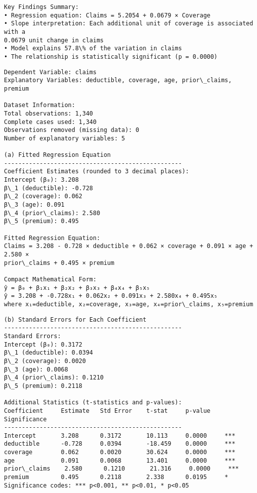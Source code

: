\documentclass[8pt, twocolumn]{extarticle}
\begin{document}
    \begin{Verbatim}[commandchars=\\\{\}]
Key Findings Summary:
• Regression equation: Claims = 5.2054 + 0.0679 × Coverage
• Slope interpretation: Each additional unit of coverage is associated with a
0.0679 unit change in claims
• Model explains 57.8\% of the variation in claims
• The relationship is statistically significant (p = 0.0000)
    \end{Verbatim}
    \begin{Verbatim}[commandchars=\\\{\}]
Dependent Variable: claims
Explanatory Variables: deductible, coverage, age, prior\_claims, premium

Dataset Information:
Total observations: 1,340
Complete cases used: 1,340
Observations removed (missing data): 0
Number of explanatory variables: 5

(a) Fitted Regression Equation
--------------------------------------------------
Coefficient Estimates (rounded to 3 decimal places):
Intercept (β₀): 3.208
β\_1 (deductible): -0.728
β\_2 (coverage): 0.062
β\_3 (age): 0.091
β\_4 (prior\_claims): 2.580
β\_5 (premium): 0.495

Fitted Regression Equation:
Claims = 3.208 - 0.728 × deductible + 0.062 × coverage + 0.091 × age + 2.580 ×
prior\_claims + 0.495 × premium

Compact Mathematical Form:
ŷ = β₀ + β₁x₁ + β₂x₂ + β₃x₃ + β₄x₄ + β₅x₅
ŷ = 3.208 + -0.728x₁ + 0.062x₂ + 0.091x₃ + 2.580x₄ + 0.495x₅
where x₁=deductible, x₂=coverage, x₃=age, x₄=prior\_claims, x₅=premium
    \end{Verbatim}
    \begin{Verbatim}[commandchars=\\\{\}]
(b) Standard Errors for Each Coefficient
--------------------------------------------------
Standard Errors:
Intercept (β₀): 0.3172
β\_1 (deductible): 0.0394
β\_2 (coverage): 0.0020
β\_3 (age): 0.0068
β\_4 (prior\_claims): 0.1210
β\_5 (premium): 0.2118

Additional Statistics (t-statistics and p-values):
Coefficient     Estimate   Std Error    t-stat     p-value    Significance
--------------------------------------------------
Intercept       3.208      0.3172       10.113     0.0000     ***
deductible      -0.728     0.0394       -18.459    0.0000     ***
coverage        0.062      0.0020       30.624     0.0000     ***
age             0.091      0.0068       13.401     0.0000     ***
prior\_claims    2.580      0.1210       21.316     0.0000     ***
premium         0.495      0.2118       2.338      0.0195     *
Significance codes: *** p<0.001, ** p<0.01, * p<0.05
    \end{Verbatim}
\end{document}
